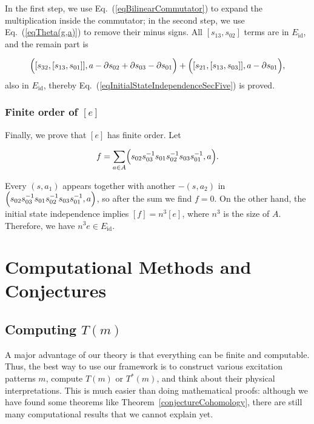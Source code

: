 \documentclass[reprint, amsmath, amssymb, showpacs, floatfix, longbibliography, aps, twocolumn, superscriptaddress, nofootinbib]{revtex4-2}
\theoremstyle{definition}
\begin{document}
\begin{widetext}
	In the first step, we use Eq.~(\ref{eqBilinearCommutator}) to expand the multiplication inside the commutator; in the second step, we use Eq.~(\ref{eqTheta(g,a)}) to remove their minus signs. All $[s_{13},s_{02}]$ terms are in $E_{\operatorname{id}}$, and the remain part is 
	
	\begin{equation}
		\begin{aligned}
			\Bigl([s_{32},[s_{13},s_{01}]],a-\partial s_{02}+\partial s_{03}-\partial s_{01}\Bigr)+\Bigl([s_{21},[s_{13},s_{03}]],a-\partial s_{01}\Bigr),
		\end{aligned}
	\end{equation}
	also in $E_{\operatorname{id}}$, thereby Eq.~(\ref{eqInitialStateIndependenceSecFive}) is proved. 
\end{widetext}

\subsubsection{Finite order of $[e]$}

Finally, we prove that $[e]$ has finite order. Let 

\begin{equation}
	f=\sum_{a\in A} \Bigl(s_{02} s_{03}^{-1} s_{01} s_{02}^{-1} s_{03} s_{01}^{-1}, a\Bigr).
\end{equation}

Every $(s,a_1)$ appears together with another $-(s,a_2)$ in $\Bigl(s_{02} s_{03}^{-1} s_{01} s_{02}^{-1} s_{03} s_{01}^{-1}, a\Bigr)$, so after the sum we find $f=0$. On the other hand, the initial state independence implies $[f]=n^3[e]$, where $n^3$ is the size of $A$. Therefore, we have $n^3 e \in E_{\operatorname{id}}$. 

 
 

\section{Computational Methods and Conjectures}\label{secComputation}

\subsection{Computing $T(m)$}

A major advantage of our theory is that everything can be finite and computable. Thus, the best way to use our framework is to construct various excitation patterns $m$, compute $T(m)$ or $T^*(m)$, and think about their physical interpretations. This is much easier than doing mathematical proofs: although we have found some theorems like Theorem~\ref{conjectureCohomology}, there are still many computational results that we cannot explain yet.
\end{document}
